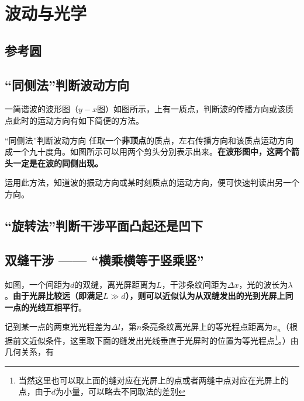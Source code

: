 
\chapter{波动与光学}

\section{参考圆}

\section{“同侧法”判断波动方向}



一简谐波的波形图（$y - x$图）如图所示，上有一质点，判断波的传播方向或该质点此时的运动方向有如下简便的方法。

\begin{theo}{“同侧法”判断波动方向}{}
任取一个\textbf{非顶点}的质点，左右传播方向和该质点运动方向成一个九十度角。如图所示可以用两个剪头分别表示出来。\textbf{在波形图中，这两个箭头一定是在波的同侧出现。}

运用此方法，知道波的振动方向或某时刻质点的运动方向，便可快速判读出另一个方向。

\end{theo}

\section{“旋转法”判断干涉平面凸起还是凹下}

\section{双缝干涉 —— “横乘横等于竖乘竖”}



如图，一个间距为$d$的双缝，离光屏距离为$L$，干涉条纹间距为$\Delta x$，光的波长为$\lambda$。\textbf{由于光屏比较远（即满足$L \gg d$），则可以近似认为从双缝发出的光到光屏上同一点的光线互相平行}。

记到某一点的两束光光程差为$\Delta l$，第$n$条亮条纹离光屏上的等光程点距离为$x_n$（根据前文近似条件，这里取下面的缝发出光线垂直于光屏时的位置为等光程点\footnote{当然这里也可以取上面的缝对应在光屏上的点或者两缝中点对应在光屏上的点，由于$d$为小量，可以略去不同取法的差别}。）由几何关系，有

